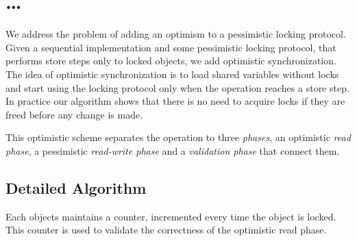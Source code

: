 \section{\ldots}
We address the problem of adding an 
optimism to a pessimistic locking protocol. 
Given a sequential implementation and some pessimistic
locking protocol, that performs store steps 
only to locked objects,
we add optimistic synchronization. 
The idea of optimistic synchronization is to load 
shared variables without locks and start using the 
locking protocol only when the operation reaches a store step.
In practice our algorithm shows that there is no need to 
acquire locks if they are freed before any change is made.    

This optimistic scheme separates the operation to three
\emph{phases}, an optimistic \emph{read phase},
a pessimistic \emph{read-write phase} and a 
\emph{validation phase} that connect them. 

\subsection{Detailed Algorithm}
Each objects maintains a counter, incremented every time the 
object is locked. This counter is used to validate the correctness
of the optimistic read phase. 

